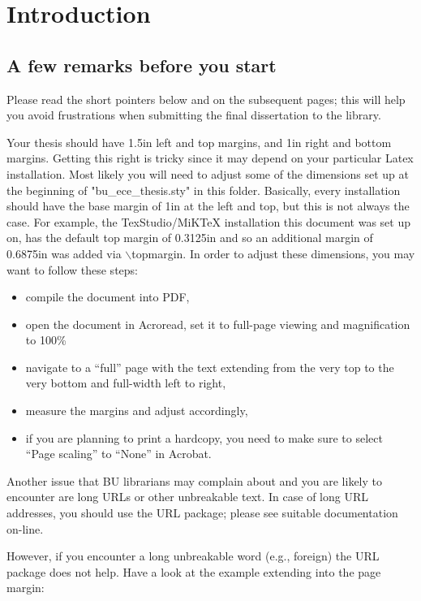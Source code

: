 \chapter{Introduction}
\label{chapter:Introduction}
\thispagestyle{myheadings}

\section{A few remarks before you start}
\label{sec:history}

Please read the short pointers below and on the subsequent pages; this will help
you avoid frustrations when submitting the final dissertation to the library.

Your thesis should have 1.5in left and top margins, and 1in right and bottom
margins. Getting this right is tricky since it may depend on your particular
Latex installation. Most likely you will need to adjust some of the dimensions
set up at the beginning of "bu\_ece\_thesis.sty" in this folder. Basically,
every installation should have the base margin of 1in at the left and top, but
this is not always the case. For example, the TexStudio/MiKTeX installation this
document was set up on, has the default top margin of 0.3125in and so an
additional margin of 0.6875in was added via $\backslash${topmargin}. In order to
adjust these dimensions, you may want to follow these steps:

\begin{itemize}
	\item compile the document into PDF,
	\item open the document in Acroread, set it to full-page viewing and
		magnification to 100\%
	\item navigate to a ``full'' page with the text extending from the very
		top to the very bottom and full-width left to right,
	\item measure the margins and adjust accordingly,
	\item if you are planning to print a hardcopy, you need to make sure
		to select ``Page scaling'' to ``None'' in Acrobat.
\end{itemize}

Another issue that BU librarians may complain about and you are likely to encounter
are long URLs or other unbreakable text. In case of long URL addresses, you
should use the URL package; please see suitable documentation on-line.

However, if you encounter a long unbreakable word (e.g., foreign) the URL
package does not help. Have a look at the example extending into the page
margin:

